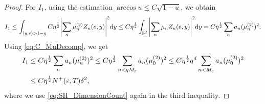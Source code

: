 \begin{proof}
  For $I_1$, using the estimation $\arccos u \leq C \sqrt {1-u}$,
  we obtain
  \begin{align*}
    I_1 \leq \int_{\left\langle{y,{e}}\right\rangle > 1-\eta} C\eta^{\frac{1}{2}} \abs{\sum_{n} \mu_n^{(2)} Z_n({e},y)}^2 \dd y
    \leq C\eta^{\frac{1}{2}} \int_{\mathbb{S}^d}  \abs{\sum_{n} \mu_n Z_n({e},y)}^2 \dd y
    = C\eta^{\frac{1}{2}} \sum_n a_n (\mu_{n}^{(2)})^2.
  \end{align*}
  Using \cref{eq:C_MuDecomp}, we get
  \begin{align}
    \notag
    I_1 & \leq C\eta^{\frac{1}{2}} \sum_n a_n (\mu_{n}^{(2)})^2
    \leq C\eta^{\frac{1}{2}} \sum_{n < qM_\varepsilon}a_n (\mu_{0}^{(2)})^2
    \leq C\eta^{\frac{1}{2}} q^d \sum_{n < M_\varepsilon} a_n (\mu_{0}^{(2)})^2 \\
    &\leq C\eta^{\frac{1}{2}} N^+(\varepsilon,T) \delta^2,
    \label{eq:Proof_MainLemma_I1_Bound}
  \end{align}
  where we use \cref{eq:SH_DimensionCount} again in the third inequality.


\end{proof}
